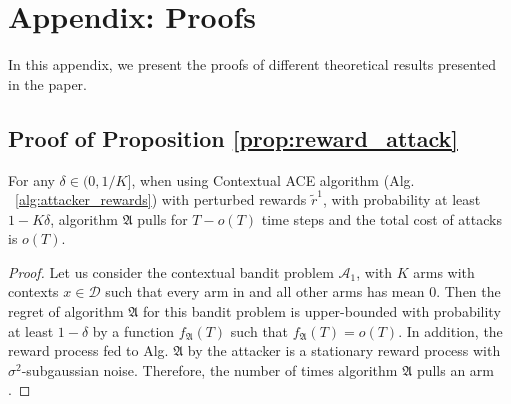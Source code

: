 
\section{Appendix: Proofs}
In this appendix, we present the proofs of different theoretical results presented in the paper.
\subsection{Proof of Proposition \ref{prop:reward_attack}}\label{app:proof_prop_rewd_attack}

\begin{prop*}
	For any $\delta\in(0, 1/K]$, when using Contextual ACE algorithm (Alg. ~\ref{alg:attacker_rewards}) with perturbed rewards $\tilde{r}^{1}$, with probability at least $1-K\delta$, algorithm $\mathfrak{A}$ pulls  for $T - o(T)$ time steps and the total cost of attacks is $o(T)$.
\end{prop*}

\begin{proof}
	Let us consider the contextual bandit problem $\mathcal{A}_{1}$, with $K$ arms with contexts $x\in \mathcal{D}$ such that every arm in  and all other arms has mean $0$. Then the regret of algorithm $\mathfrak{A}$ for this bandit problem is upper-bounded with probability at least $1 - \delta$ by a function $f_{\mathfrak{A}}(T)$ such that $f_{\mathfrak{A}}(T) = o(T)$. In addition, the reward process fed to Alg. $\mathfrak{A}$ by the attacker is a stationary reward process with $\sigma^{2}$-subgaussian noise. Therefore, the number of times algorithm $\mathfrak{A}$ pulls an arm . 

\end{proof}

